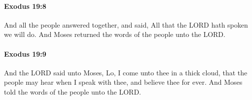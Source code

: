 		\paragraph{Exodus 19:8} %
			\label{EXODUS-19-8}

			And all the people answered together, and said, All that the LORD hath spoken we will do. And Moses returned the words of the people unto the LORD.


		\paragraph{Exodus 19:9} %
			\label{EXODUS-19-9}

			And the LORD said unto Moses, Lo, I come unto thee in a thick cloud, that the people may hear when I speak with thee, and believe thee for ever. And Moses told the words of the people unto the LORD.


